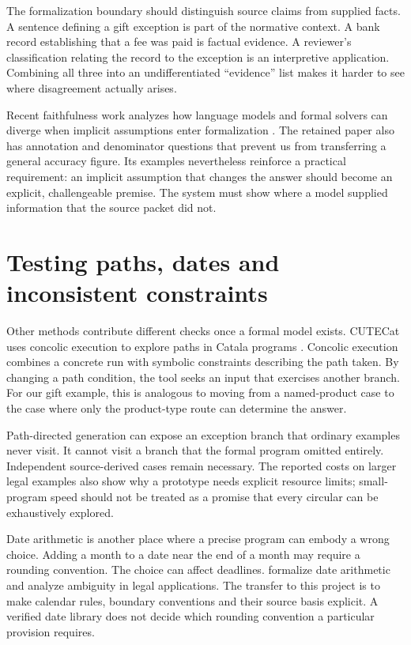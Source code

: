 \documentclass[12pt,a4paper,oneside,openany]{book}
\begin{document}
The formalization boundary should distinguish source claims from supplied
facts. A sentence defining a gift exception is part of the normative context.
A bank record establishing that a fee was paid is factual evidence. A
reviewer's classification relating the record to the exception is an
interpretive application. Combining all three into an undifferentiated
``evidence'' list makes it harder to see where disagreement actually arises.

Recent faithfulness work analyzes how language models and formal solvers can
diverge when implicit assumptions enter formalization \citep{limits2026}.
The retained paper also has annotation and denominator questions that prevent
us from transferring a general accuracy figure. Its examples nevertheless
reinforce a practical requirement: an implicit assumption that changes the
answer should become an explicit, challengeable premise. The system must
show where a model supplied information that the source packet did not.

\section{Testing paths, dates and inconsistent constraints}
\label{merge:M04:13}

\label{sec:languages-analysis}
Other methods contribute different checks once a formal model exists.
CUTECat uses concolic execution to explore paths in Catala programs
\citep[secs.~2--5]{cutecat2025}. Concolic execution combines a concrete run
with symbolic constraints describing the path taken. By changing a path
condition, the tool seeks an input that exercises another branch. For our
gift example, this is analogous to moving from a named-product case to the
case where only the product-type route can determine the answer.

Path-directed generation can expose an exception branch that ordinary
examples never visit. It cannot visit a branch that the formal program
omitted entirely. Independent source-derived cases remain necessary. The
reported costs on larger legal examples also show why a prototype needs
explicit resource limits; small-program speed should not be treated as a
promise that every circular can be exhaustively explored.

Date arithmetic is another place where a precise program can embody a wrong
choice. Adding a month to a date near the end of a month may require a
rounding convention. The choice can affect deadlines. \citet{dates2024}
formalize date arithmetic and analyze ambiguity in legal applications. The
transfer to this project is to make calendar rules, boundary conventions and
their source basis explicit. A verified date library does not decide which
rounding convention a particular provision requires.
\end{document}
